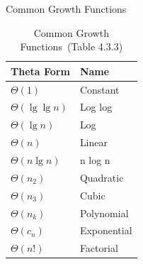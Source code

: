 \documentclass{beamer}
\begin{document}
        \begin{frame}[c,shrink]{Common Growth Functions}
            \begin{table}[tp]%
                \caption{Common Growth Functions\ (Table 4.3.3)}
                \label{cgf}\centering%
                \begin{tabular}{ll}
                    \hline%
                    Theta Form             & Name         \\\hline%
                    $\Theta(1)         $   & Constant     \\
                    $\Theta(\lg\lg{n}) $   & Log log      \\
                    $\Theta(\lg{n})    $   & Log          \\
                    $\Theta(n)         $   & Linear       \\
                    $\Theta(n\lg{n})   $   & n log n      \\
                    $\Theta(n_2)       $   & Quadratic    \\
                    $\Theta(n_3)       $   & Cubic        \\
                    $\Theta(n_k)       $   & Polynomial   \\
                    $\Theta(c_n)       $   & Exponential  \\
                    $\Theta(n!)        $   & Factorial    \\\hline%
                \end{tabular}
            \end{table}
        \end{frame}
        
\end{document}
